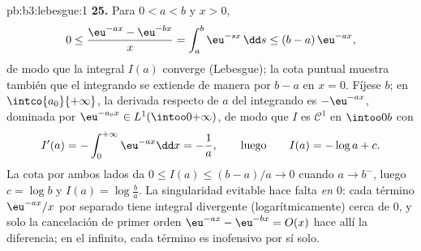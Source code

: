 \begin{solution}{pb:b3:lebesgue:1}
\textbf{25.} Para $0 < a < b$ y $x > 0$,
\[
0 \leq \frac{\eu^{-ax} - \eu^{-bx}}{x}
= \int_a^b \eu^{-sx}\,\dd s \leq (b - a)\,\eu^{-ax},
\]
de modo que la integral $I(a)$ converge (Lebesgue); la cota puntual
muestra también que el integrando se extiende de manera
 por $b -
a$ en $x = 0$. Fíjese $b$; en $\intco{a_0}{+\infty}$, la derivada
respecto de $a$ del integrando es $-\eu^{-ax}$, dominada por
$\eu^{-a_0x} \in L^1(\intoo0{+\infty})$, de modo que $I$ es $\mathcal
C^1$ en $\intoo0b$ con
\[
I'(a) = -\int_0^{+\infty}\eu^{-ax}\dd x = -\frac1a,
\qquad\text{luego}\qquad
I(a) = -\log a + c .
\]
La cota por ambos lados da $0 \leq I(a) \leq (b-a)/a \to 0$ cuando
$a \to b^-$, luego $c = \log b$ y $I(a) = \log\frac ba$. La singularidad
evitable hace falta \emph{en $0$}: cada término $\eu^{-ax}/x$ por
separado tiene integral divergente (logarítmicamente) cerca de $0$, y
solo la cancelación de primer orden $\eu^{-ax} - \eu^{-bx} = O(x)$ hace
 allí la diferencia; en el
infinito, cada término es inofensivo por sí solo.
\end{solution}
